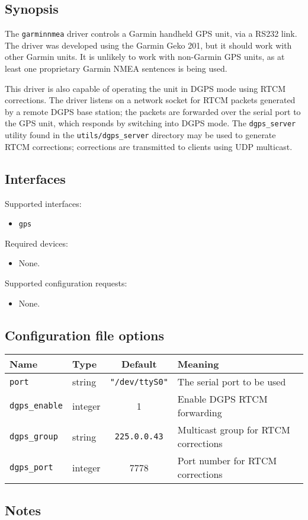 \subsection*{Synopsis}

The {\tt garminnmea} driver controls a Garmin handheld GPS unit, via a
RS232 link.  The driver was developed using the Garmin Geko 201, but
it should work with other Garmin units.  It is unlikely to work with
non-Garmin GPS units, as at least one proprietary Garmin NMEA
sentences is being used.

This driver is also capable of operating the unit in DGPS mode using
RTCM corrections.  The driver listens on a network socket for RTCM
packets generated by a remote DGPS base station; the packets are
forwarded over the serial port to the GPS unit, which responds by
switching into DGPS mode.  The {\tt dgps\_server} utility found in the
{\tt utils/dgps\_server} directory may be used to generate RTCM
corrections; corrections are transmitted to clients using UDP
multicast.


\subsection*{Interfaces}

\noindent Supported interfaces:
\begin{itemize}
\item {\tt gps}
\end{itemize}

\noindent Required devices:
\begin{itemize}
\item None.
\end{itemize}

\noindent Supported configuration requests:
\begin{itemize}
\item None.
\end{itemize}

\subsection*{Configuration file options}

\begin{center}
{\small \begin{tabularx}{\columnwidth}{|l|l|c|X|}
\hline
Name & Type & Default & Meaning\\
\hline
{\tt port} & string & {\tt "/dev/ttyS0"} & The serial port to be used\\
{\tt dgps\_enable} & integer & 1 & Enable DGPS RTCM forwarding \\
{\tt dgps\_group} & string & {\tt 225.0.0.43} & Multicast group for RTCM corrections \\
{\tt dgps\_port} & integer & 7778 & Port number for RTCM corrections \\
\hline
\end{tabularx}}
\end{center}

\subsection*{Notes}
